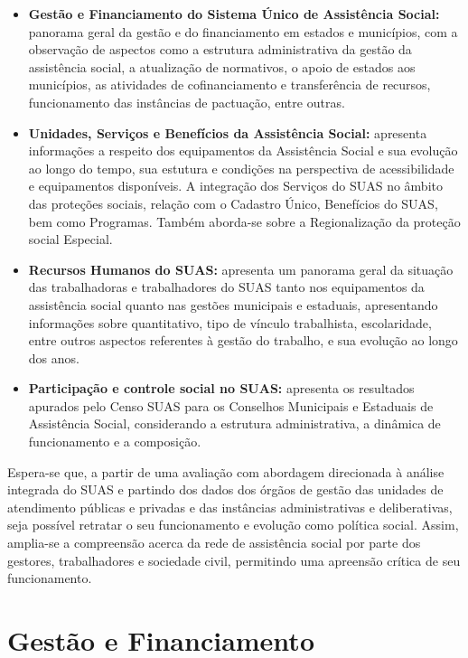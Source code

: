 \documentclass[
  letterpaper,
  DIV=11,
  numbers=noendperiod]{scrreprt}
\begin{document}
\begin{itemize}
\item
  \textbf{Gestão e Financiamento do Sistema Único de Assistência
  Social:} panorama geral da gestão e do financiamento em estados e
  municípios, com a observação de aspectos como a estrutura
  administrativa da gestão da assistência social, a atualização de
  normativos, o apoio de estados aos municípios, as atividades de
  cofinanciamento e transferência de recursos, funcionamento das
  instâncias de pactuação, entre outras.
\item
  \textbf{Unidades, Serviços e Benefícios da Assistência Social:}
  apresenta informações a respeito dos equipamentos da Assistência
  Social e sua evolução ao longo do tempo, sua estutura e condições na
  perspectiva de acessibilidade e equipamentos disponíveis. A integração
  dos Serviços do SUAS no âmbito das proteções sociais, relação com o
  Cadastro Único, Benefícios do SUAS, bem como Programas. Também
  aborda-se sobre a Regionalização da proteção social Especial.
\item
  \textbf{Recursos Humanos do SUAS:} apresenta um panorama geral da
  situação das trabalhadoras e trabalhadores do SUAS tanto nos
  equipamentos da assistência social quanto nas gestões municipais e
  estaduais, apresentando informações sobre quantitativo, tipo de
  vínculo trabalhista, escolaridade, entre outros aspectos referentes à
  gestão do trabalho, e sua evolução ao longo dos anos.
\item
  \textbf{Participação e controle social no SUAS:} apresenta os
  resultados apurados pelo Censo SUAS para os Conselhos Municipais e
  Estaduais de Assistência Social, considerando a estrutura
  administrativa, a dinâmica de funcionamento e a composição.
\end{itemize}

Espera-se que, a partir de uma avaliação com abordagem direcionada à
análise integrada do SUAS e partindo dos dados dos órgãos de gestão das
unidades de atendimento públicas e privadas e das instâncias
administrativas e deliberativas, seja possível retratar o seu
funcionamento e evolução como política social. Assim, amplia-se a
compreensão acerca da rede de assistência social por parte dos gestores,
trabalhadores e sociedade civil, permitindo uma apreensão crítica de seu
funcionamento.


\chapter{Gestão e Financiamento}\label{gestuxe3o-e-financiamento}
\end{document}
